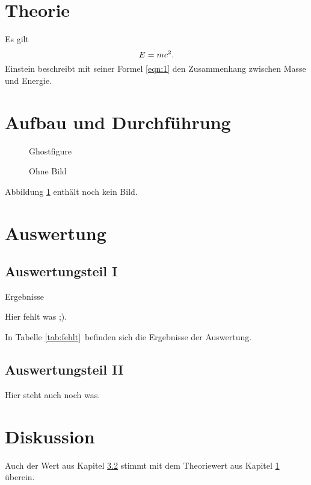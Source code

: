 \documentclass[
  captions=tableheading,
]{scrartcl}
\begin{document}
\section{Theorie} \label{sec:theorie}

Es gilt
\begin{equation}
  E = mc^2 .\label{eqn:1}\\
\end{equation}
Einstein beschreibt mit seiner Formel \eqref{eqn:1} den Zusammenhang zwischen Masse und Energie.

\section{Aufbau und Durchführung}

\begin{figure}
  \centering
  Ghostfigure
  \caption{Ohne Bild}
  \label{fig:ghost}
\end{figure}
Abbildung \ref{fig:ghost} enthält noch kein Bild.

\section{Auswertung}

\subsection{Auswertungsteil I}

\begin{table}
  \centering
  \caption{Ergebnisse}
  \label{tab:fehlt}
  Hier fehlt was ;).
\end{table}
In Tabelle \ref{tab:fehlt} befinden sich die Ergebnisse der Auswertung.

\subsection{Auswertungsteil II} \label{sec:aus2}

Hier steht auch noch was.

\section{Diskussion}

Auch der Wert aus Kapitel \ref{sec:aus2} stimmt mit
dem Theoriewert aus Kapitel \ref{sec:theorie} überein.
\end{document}
